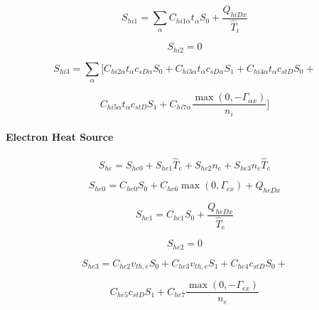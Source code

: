 \documentclass[11pt]{article}
\begin{document}
\begin{equation}
S_{hi1}=\sum_{\alpha}C_{hi1\alpha}t_{\alpha}S_{0}+\frac{Q_{hiDx}}{\widehat
{T}_{i}}   \label{77}
\end{equation}

\begin{equation}
S_{hi2}=0   \label{78}
\end{equation}

\begin{equation*}
S_{hi3}=\sum_{\alpha}[C_{hi2\alpha}t_{\alpha}c_{sD\alpha}S_{0}+C_{hi3\alpha
}t_{\alpha}c_{sD\alpha}S_{1}+C_{hi4\alpha}t_{\alpha}c_{stD}S_{0}+ 
\end{equation*}

\begin{equation}
C_{hi5\alpha}t_{\alpha}c_{stD}S_{1}+C_{hi7\alpha}\frac{\max\left(
0,-\Gamma_{\alpha x}\right) }{n_{i}}]   \label{79}
\end{equation}

\bigskip

\paragraph{\protect\bigskip Electron Heat Source}

\begin{equation}
S_{he}=S_{he0}+S_{he1}\widehat{T}_{e}+S_{he2}n_{e}+S_{he3}n_{e}\widehat{T}%
_{e}   \label{80}
\end{equation}

\begin{equation}
S_{he0}=C_{he0}S_{0}+C_{he6}\max\left( 0,\Gamma_{ex}\right) +Q_{heDx} 
\label{81}
\end{equation}

\begin{equation}
S_{he1}=C_{he1}S_{0}+\frac{Q_{heDx}}{\widehat{T}_{e}}   \label{82}
\end{equation}

\begin{equation}
S_{he2}=0   \label{83}
\end{equation}

\begin{equation*}
S_{he3}=C_{he2}v_{th,e}S_{0}+C_{he3}v_{th,e}S_{1}+C_{he4}c_{stD}S_{0}+ 
\end{equation*}

\begin{equation}
C_{he5}c_{stD}S_{1}+C_{he7}\frac{\max\left( 0,-\Gamma_{ex}\right) }{n_{e}} 
\label{84}
\end{equation}
\end{document}
